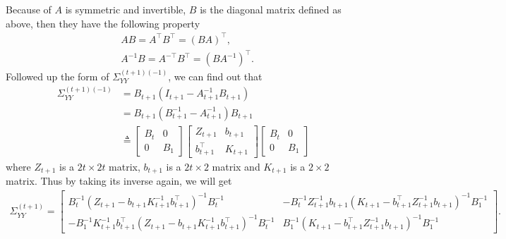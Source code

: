 Because of $A$ is symmetric and invertible, $B$ is the diagonal matrix defined as above, then they have the following property 
\begin{align*}
& AB=A^\top B^\top = (BA)^\top, \\
& A^{-1}B = A^{-\top}B^\top = (BA^{-1})^\top. 
\end{align*}
Followed up the form of $\Sigma_{YY}^{(t+1) (-1)}$, we can find out that 
\begin{align*}
\Sigma_{YY}^{(t+1) (-1)} &= B_{t+1}(I_{t+1}-A_{t+1}^{-1}B_{t+1}) \\
&= B_{t+1}(B_{t+1}^{-1}-A_{t+1}^{-1})B_{t+1} \\
&\triangleq \begin{bmatrix} 
B_t & 0 \\ 0 & B_1 \end{bmatrix}
\begin{bmatrix} 
Z_{t+1} & b_{t+1} \\
b_{t+1}^\top & K_{t+1}
\end{bmatrix} \begin{bmatrix} 
B_t & 0 \\ 0 & B_1\end{bmatrix}
\end{align*}
where $Z_{t+1}$ is a $2t \times 2t$ matrix, $ b_{t+1} $ is a $2t \times 2$ matrix and $K_{t+1}$ is a $2 \times 2$ matrix. Thus by taking its inverse again, we will get 
\begin{align*} \Sigma_{YY}^{(t+1)}= \left[ \begin{matrix}
B_t^{-1} (Z_{t+1}-b_{t+1}K_{t+1}^{-1}b_{t+1}^\top)^{-1}B_t^{-1}  & - B_t^{-1}  Z_{t+1}^{-1}b_{t+1}(K_{t+1}-b_{t+1}^\top Z_{t+1}^{-1}b_{t+1})^{-1}B_1^{-1} \\
-B_1^{-1}  K_{t+1}^{-1}b_{t+1}^\top (Z_{t+1}-b_{t+1}K_{t+1}^{-1}b_{t+1}^\top)^{-1}B_t^{-1}  & B_1^{-1}  (K_{t+1}-b_{t+1}^\top Z_{t+1}^{-1}b_{t+1})^{-1}B_1^{-1} 
\end{matrix}\right].
\end{align*}

